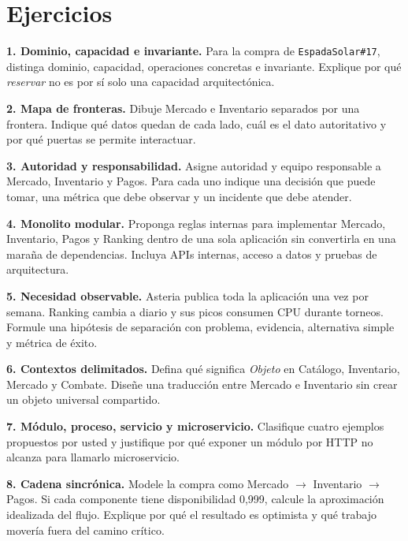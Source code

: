 \documentclass[variant=guia,cover=institutional,mode=screen]{ua-engineering-v6-article}
\begin{document}
\section{Ejercicios}
\begin{uaexercise}
\textbf{1. Dominio, capacidad e invariante.} Para la compra de \texttt{EspadaSolar\#17}, distinga dominio, capacidad, operaciones concretas e invariante. Explique por qué \emph{reservar} no es por sí solo una capacidad arquitectónica.
\end{uaexercise}
\begin{uaexercise}
\textbf{2. Mapa de fronteras.} Dibuje Mercado e Inventario separados por una frontera. Indique qué datos quedan de cada lado, cuál es el dato autoritativo y por qué puertas se permite interactuar.
\end{uaexercise}
\begin{uaexercise}
\textbf{3. Autoridad y responsabilidad.} Asigne autoridad y equipo responsable a Mercado, Inventario y Pagos. Para cada uno indique una decisión que puede tomar, una métrica que debe observar y un incidente que debe atender.
\end{uaexercise}
\begin{uaexercise}
\textbf{4. Monolito modular.} Proponga reglas internas para implementar Mercado, Inventario, Pagos y Ranking dentro de una sola aplicación sin convertirla en una maraña de dependencias. Incluya APIs internas, acceso a datos y pruebas de arquitectura.
\end{uaexercise}
\begin{uaexercise}
\textbf{5. Necesidad observable.} Asteria publica toda la aplicación una vez por semana. Ranking cambia a diario y sus picos consumen CPU durante torneos. Formule una hipótesis de separación con problema, evidencia, alternativa simple y métrica de éxito.
\end{uaexercise}
\begin{uaexercise}
\textbf{6. Contextos delimitados.} Defina qué significa \emph{Objeto} en Catálogo, Inventario, Mercado y Combate. Diseñe una traducción entre Mercado e Inventario sin crear un objeto universal compartido.
\end{uaexercise}
\begin{uaexercise}
\textbf{7. Módulo, proceso, servicio y microservicio.} Clasifique cuatro ejemplos propuestos por usted y justifique por qué exponer un módulo por HTTP no alcanza para llamarlo microservicio.
\end{uaexercise}
\begin{uaexercise}
\textbf{8. Cadena sincrónica.} Modele la compra como Mercado $\rightarrow$ Inventario $\rightarrow$ Pagos. Si cada componente tiene disponibilidad 0,999, calcule la aproximación idealizada del flujo. Explique por qué el resultado es optimista y qué trabajo movería fuera del camino crítico.
\end{uaexercise}
\end{document}
